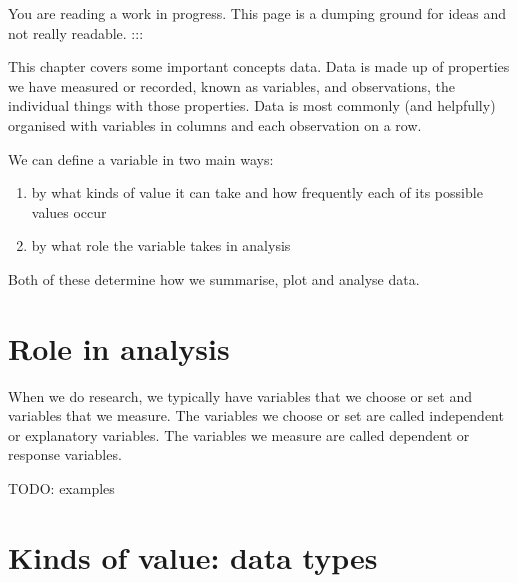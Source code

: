 \documentclass[
  letterpaper,
  DIV=11,
  numbers=noendperiod]{scrreprt}
\providecommand{\tightlist}{%
  \setlength{\itemsep}{0pt}\setlength{\parskip}{0pt}}\usepackage{longtable,booktabs,array}
\begin{document}
\begin{tcolorbox}[enhanced jigsaw, opacitybacktitle=0.6, toprule=.15mm, arc=.35mm, colback=white, colframe=quarto-callout-important-color-frame, opacityback=0, titlerule=0mm, colbacktitle=quarto-callout-important-color!10!white, leftrule=.75mm, breakable, bottomtitle=1mm, toptitle=1mm, title=\textcolor{quarto-callout-important-color}{\faExclamation}\hspace{0.5em}{Important}, rightrule=.15mm, bottomrule=.15mm, coltitle=black, left=2mm]

You are reading a work in progress. This page is a dumping ground for
ideas and not really readable. :::

\end{tcolorbox}

This chapter covers some important concepts data. Data is made up of
properties we have measured or recorded, known as variables, and
observations, the individual things with those properties. Data is most
commonly (and helpfully) organised with variables in columns and each
observation on a row.

We can define a variable in two main ways:

\begin{enumerate}
\def\labelenumi{\arabic{enumi}.}
\tightlist
\item
  by what kinds of value it can take and how frequently each of its
  possible values occur
\item
  by what role the variable takes in analysis
\end{enumerate}

Both of these determine how we summarise, plot and analyse data.

\hypertarget{role-in-analysis}{%
\section{Role in analysis}\label{role-in-analysis}}

When we do research, we typically have variables that we choose or set
and variables that we measure. The variables we choose or set are called
independent or explanatory variables. The variables we measure are
called dependent or response variables.

TODO: examples

\hypertarget{kinds-of-value-data-types}{%
\section{Kinds of value: data types}\label{kinds-of-value-data-types}}
\end{document}
